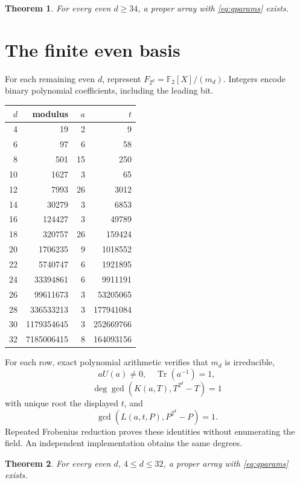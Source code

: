 \documentclass[11pt]{article}
\newtheorem{theorem}{Theorem}[section]
\theoremstyle{definition}\newtheorem{definition}[theorem]{Definition}
\theoremstyle{remark}\newtheorem{remark}[theorem]{Remark}
\DeclareMathOperator{\Tr}{Tr}
\newcommand{\F}{\mathbb F}
\begin{document}
\begin{theorem}
\label{thm:largeeven}
For every even \(d\geq34\), a proper array with \eqref{eq:qparams} exists.
\end{theorem}

\section{The finite even basis}
For each remaining even \(d\), represent \(F_{2^d}=\F_2[X]/(m_d)\).
Integers encode binary polynomial coefficients, including the leading bit.

\begin{center}
\begin{tabular}{rrrr}
\toprule
\(d\)&modulus&\(a\)&\(t\)\\
\midrule
4&19&2&9\\
6&97&6&58\\
8&501&15&250\\
10&1627&3&65\\
12&7993&26&3012\\
14&30279&3&6853\\
16&124427&3&49789\\
18&320757&26&159424\\
20&1706235&9&1018552\\
22&5740747&6&1921895\\
24&33394861&6&9911191\\
26&99611673&3&53205065\\
28&336533213&3&177941084\\
30&1179354645&3&252669766\\
32&7185006415&8&164093156\\
\bottomrule
\end{tabular}
\end{center}

For each row, exact polynomial arithmetic verifies that \(m_d\) is
irreducible,
\[
 aU(a)\neq0,\quad \Tr(a^{-1})=1,
\]
\begin{equation}
 \deg\gcd(K(a,T),T^{2^d}-T)=1
 \label{eq:gcdK}
\end{equation}
with unique root the displayed \(t\), and
\begin{equation}
 \gcd(L(a,t,P),P^{2^d}-P)=1.
 \label{eq:gcdL}
\end{equation}
Repeated Frobenius reduction proves these identities without enumerating the
field.  An independent implementation obtains the same degrees.

\begin{theorem}
\label{thm:smalleven}
For every even \(d\), \(4\leq d\leq32\), a proper array with
\eqref{eq:qparams} exists.
\end{theorem}
\end{document}
